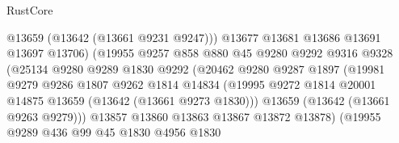 \begin{lexlean}{RustCore}
\begin{coremodule}
                                      @13659
                                      (@13642 (@13661 @9231 @9247)))
                                    @13677
                                    @13681
                                    @13686
                                    @13691
                                    @13697
                                    @13706)
                                  (@19955
                                    @9257
                                    @858
                                    @880
                                    @45
                                    @9280
                                    @9292
                                    @9316
                                    @9328
                                    (@25134
                                      @9280
                                      @9289
                                      @1830
                                      @9292
                                      (@20462
                                        @9280
                                        @9287
                                        @1897
                                        (@19981
                                          @9279
                                          @9286
                                          @1807
                                          @9262
                                          @1814
                                          @14834
                                          (@19995
                                            @9272
                                            @1814
                                            @20001
                                            @14875
                                            @13659
                                            (@13642 (@13661 @9273 @1830)))
                                          @13659
                                          (@13642 (@13661 @9263 @9279)))
                                        @13857
                                        @13860
                                        @13863
                                        @13867
                                        @13872
                                        @13878)
                                      (@19955
                                        @9289
                                        @436
                                        @99
                                        @45
                                        @1830
                                        @4956
                                        @1830

\end{coremodule}
\end{lexlean}
